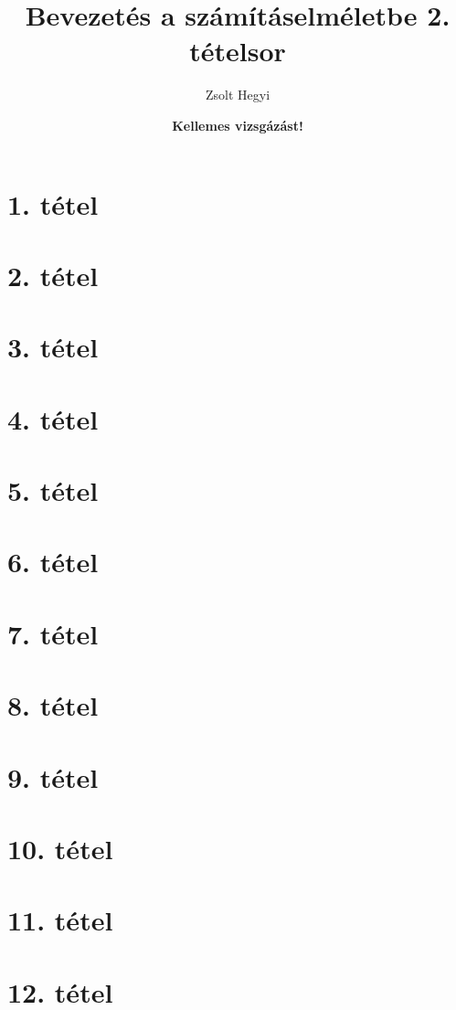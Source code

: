 \documentclass[ebook]{memoir}
\title{Bevezetés a számításelméletbe 2. tételsor}
\author{Zsolt Hegyi\\}
\date{\textbf{Kellemes vizsgázást!}} %
\begin{document}
\maketitle
\tableofcontents*
\newpage
\section{1. tétel}

\newpage
\section{2. tétel}

\newpage
\section{3. tétel}

\newpage
\section{4. tétel}

\newpage
\section{5. tétel}

\newpage
\section{6. tétel}

\newpage
\section{7. tétel}

\newpage
\section{8. tétel}

\newpage
\section{9. tétel}

\newpage
\section{10. tétel}

\newpage
\section{11. tétel}

\newpage
\section{12. tétel}

\newpage
\end{document}
